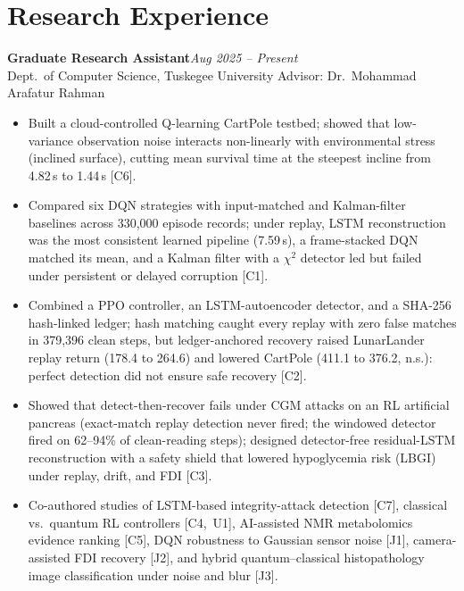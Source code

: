 \documentclass[10pt,letterpaper]{article}
\newcommand{\position}[3]{%
  \textbf{#1}\hfill{\color{muted}\textit{#2}}\\
  {\color{dark}#3}\par\vspace{1pt}}
\begin{document}
\section{Research Experience}
\position{Graduate Research Assistant}{Aug 2025 -- Present}
{Dept.\ of Computer Science, Tuskegee University \quad\textbullet\quad Advisor: Dr.\ Mohammad Arafatur Rahman}
\begin{itemize}
  \item Built a cloud-controlled Q-learning CartPole testbed; showed that low-variance observation noise
  interacts non-linearly with environmental stress (inclined surface), cutting mean survival time at the
  steepest incline from 4.82\,s to 1.44\,s [C6].
  \item Compared six DQN strategies with input-matched and Kalman-filter baselines across 330,000 episode records;
  under replay, LSTM reconstruction was the most consistent learned pipeline (7.59\,s), a frame-stacked DQN
  matched its mean, and a Kalman filter with a $\chi^2$ detector led but failed under persistent or delayed corruption [C1].
  \item Combined a PPO controller, an LSTM-autoencoder detector, and a SHA-256 hash-linked ledger; hash matching
  caught every replay with zero false matches in 379,396 clean steps, but ledger-anchored recovery raised
  LunarLander replay return (178.4 to 264.6) and lowered CartPole (411.1 to 376.2, n.s.): perfect detection did
  not ensure safe recovery [C2].
  \item Showed that detect-then-recover fails under CGM attacks on an RL artificial pancreas (exact-match replay
  detection never fired; the windowed detector fired on 62--94\% of clean-reading steps); designed detector-free
  residual-LSTM reconstruction with a safety shield that lowered hypoglycemia risk (LBGI) under replay, drift,
  and FDI [C3].
  \item Co-authored studies of LSTM-based integrity-attack detection [C7], classical vs.\ quantum RL controllers
  [C4,~U1], AI-assisted NMR metabolomics evidence ranking [C5], DQN robustness to Gaussian sensor noise [J1],
  camera-assisted FDI recovery [J2], and hybrid quantum--classical histopathology image classification under
  noise and blur [J3].
\end{itemize}

\end{document}
